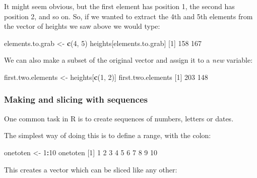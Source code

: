 \documentclass[]{article}
\newenvironment{Shaded}{\begin{snugshade}}{\end{snugshade}}
\newcommand{\DecValTok}[1]{\textcolor[rgb]{0.00,0.00,0.81}{#1}}
\newcommand{\KeywordTok}[1]{\textcolor[rgb]{0.13,0.29,0.53}{\textbf{#1}}}
\newcommand{\NormalTok}[1]{#1}
\newcommand{\OperatorTok}[1]{\textcolor[rgb]{0.81,0.36,0.00}{\textbf{#1}}}
\newcommand{\StringTok}[1]{\textcolor[rgb]{0.31,0.60,0.02}{#1}}
\begin{document}
It might seem obvious, but the first element has position 1, the second has
position 2, and so on. So, if we wanted to extract the 4th and 5th elements from
the vector of heights we saw above we would type:

\begin{Shaded}
\begin{Highlighting}[]
\NormalTok{elements.to.grab <-}\StringTok{ }\KeywordTok{c}\NormalTok{(}\DecValTok{4}\NormalTok{, }\DecValTok{5}\NormalTok{)}
\NormalTok{heights[elements.to.grab]}
\NormalTok{[}\DecValTok{1}\NormalTok{] }\DecValTok{158} \DecValTok{167}
\end{Highlighting}
\end{Shaded}

We can also make a subset of the original vector and assign it to a \emph{new}
variable:

\begin{Shaded}
\begin{Highlighting}[]
\NormalTok{first.two.elements <-}\StringTok{ }\NormalTok{heights[}\KeywordTok{c}\NormalTok{(}\DecValTok{1}\NormalTok{, }\DecValTok{2}\NormalTok{)]}
\NormalTok{first.two.elements}
\NormalTok{[}\DecValTok{1}\NormalTok{] }\DecValTok{203} \DecValTok{148}
\end{Highlighting}
\end{Shaded}

\hypertarget{making-sequences}{%
\subsubsection*{Making and slicing with sequences}\label{making-sequences}}

One common task in R is to create sequences of numbers, letters or dates.

The simplest way of doing this is to define a range, with the colon:

\begin{Shaded}
\begin{Highlighting}[]
\NormalTok{onetoten <-}\StringTok{ }\DecValTok{1}\OperatorTok{:}\DecValTok{10}
\NormalTok{onetoten}
\NormalTok{ [}\DecValTok{1}\NormalTok{]  }\DecValTok{1}  \DecValTok{2}  \DecValTok{3}  \DecValTok{4}  \DecValTok{5}  \DecValTok{6}  \DecValTok{7}  \DecValTok{8}  \DecValTok{9} \DecValTok{10}
\end{Highlighting}
\end{Shaded}

This creates a vector which can be sliced like any other:
\end{document}
